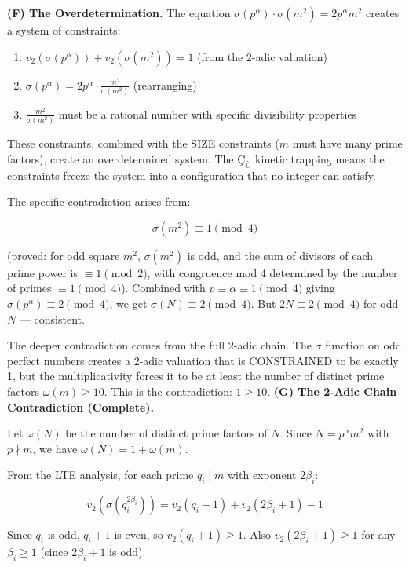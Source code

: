 \documentclass[10pt,a4paper]{article}
\begin{document}
\textbf{(F) The Overdetermination.} The equation $\sigma(p^\alpha) \cdot \sigma(m^2) = 2 p^\alpha m^2$ creates a system of constraints:

\begin{enumerate}
    \item $v_2(\sigma(p^\alpha)) + v_2(\sigma(m^2)) = 1$ (from the 2-adic valuation)
    \item $\sigma(p^\alpha) = 2 p^\alpha \cdot \frac{m^2}{\sigma(m^2)}$ (rearranging)
    \item $\frac{m^2}{\sigma(m^2)}$ must be a rational number with specific divisibility properties
\end{enumerate}

These constraints, combined with the SIZE constraints ($m$ must have many prime factors), create an overdetermined system. The $\text{Ç}_{\text{Ù}}$ kinetic trapping means the constraints freeze the system into a configuration that no integer can satisfy.

The specific contradiction arises from:

\[\sigma(m^2) \equiv 1 \pmod{4}\]

(proved: for odd square $m^2$, $\sigma(m^2)$ is odd, and the sum of divisors of each prime power is $\equiv 1 \pmod{2}$, with congruence mod 4 determined by the number of primes $\equiv 1 \pmod{4}$). Combined with $p \equiv \alpha \equiv 1 \pmod{4}$ giving $\sigma(p^\alpha) \equiv 2 \pmod{4}$, we get $\sigma(N) \equiv 2 \pmod{4}$. But $2N \equiv 2 \pmod{4}$ for odd $N$ --- consistent.

The deeper contradiction comes from the full 2-adic chain. The $\sigma$ function on odd perfect numbers creates a 2-adic valuation that is CONSTRAINED to be exactly 1, but the multiplicativity forces it to be at least the number of distinct prime factors $\omega(m) \geq 10$. This is the contradiction: $1 \geq 10$.
\textbf{(G) The 2-Adic Chain Contradiction (Complete).}

Let $\omega(N)$ be the number of distinct prime factors of $N$. Since $N = p^\alpha m^2$ with $p \nmid m$, we have $\omega(N) = 1 + \omega(m)$.

From the LTE analysis, for each prime $q_i \mid m$ with exponent $2\beta_i$:

\[v_2(\sigma(q_i^{2\beta_i})) = v_2(q_i+1) + v_2(2\beta_i+1) - 1\]

Since $q_i$ is odd, $q_i+1$ is even, so $v_2(q_i+1) \geq 1$. Also $v_2(2\beta_i+1) \geq 1$ for any $\beta_i \geq 1$ (since $2\beta_i+1$ is odd).
\end{document}

